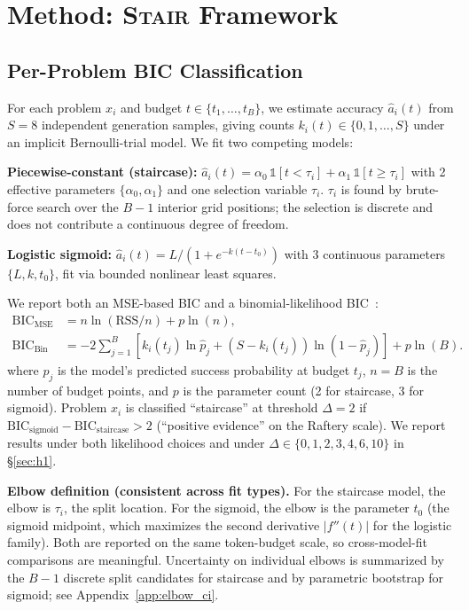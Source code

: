 \documentclass{article}
\newcommand{\method}{\textsc{Stair}}
\begin{document}
\section{Method: \method{} Framework}
\label{sec:method}

\subsection{Per-Problem BIC Classification}

For each problem $x_i$ and budget $t \in \{t_1, \ldots, t_B\}$, we estimate accuracy $\hat{a}_i(t)$ from $S{=}8$ independent generation samples, giving counts $k_i(t) \in \{0, 1, \ldots, S\}$ under an implicit Bernoulli-trial model.  We fit two competing models:

\textbf{Piecewise-constant (staircase):} $\hat{a}_i(t) = \alpha_0\,\mathbb{1}[t < \tau_i] + \alpha_1\,\mathbb{1}[t \geq \tau_i]$ with 2 effective parameters $\{\alpha_0, \alpha_1\}$ and one selection variable $\tau_i$.  $\tau_i$ is found by brute-force search over the $B{-}1$ interior grid positions; the selection is discrete and does not contribute a continuous degree of freedom.

\textbf{Logistic sigmoid:} $\hat{a}_i(t) = L / (1 + e^{-k(t - t_0)})$ with 3 continuous parameters $\{L, k, t_0\}$, fit via bounded nonlinear least squares.

We report both an MSE-based BIC and a binomial-likelihood BIC~\citep{kass1995bayes}:
\begin{align*}
\text{BIC}_{\text{MSE}} &= n \ln(\text{RSS}/n) + p \ln(n), \\
\text{BIC}_{\text{Bin}} &= -2 \sum_{j=1}^{B}\! \left[ k_i(t_j) \ln \hat{p}_j + (S{-}k_i(t_j)) \ln(1{-}\hat{p}_j) \right] + p \ln(B).
\end{align*}
where $\hat{p}_j$ is the model's predicted success probability at budget $t_j$, $n{=}B$ is the number of budget points, and $p$ is the parameter count (2 for staircase, 3 for sigmoid).  Problem $x_i$ is classified ``staircase'' at threshold $\Delta{=}2$ if $\text{BIC}_{\text{sigmoid}} - \text{BIC}_{\text{staircase}} > 2$ (``positive evidence'' on the Raftery scale).  We report results under both likelihood choices and under $\Delta \in \{0, 1, 2, 3, 4, 6, 10\}$ in \S\ref{sec:h1}.

\textbf{Elbow definition (consistent across fit types).}  For the staircase model, the elbow is $\tau_i$, the split location.  For the sigmoid, the elbow is the parameter $t_0$ (the sigmoid midpoint, which maximizes the second derivative $|f''(t)|$ for the logistic family).  Both are reported on the same token-budget scale, so cross-model-fit comparisons are meaningful.  Uncertainty on individual elbows is summarized by the $B{-}1$ discrete split candidates for staircase and by parametric bootstrap for sigmoid; see Appendix~\ref{app:elbow_ci}.
\end{document}
